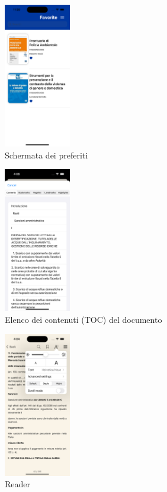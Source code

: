 \begin{multicols}{3}
    \begin{figure}[H]
        \centering
        \includegraphics[width=0.26\textwidth]{img/Simulator Screen Shot - iPhone 14 Pro - 2022-10-05 at 11.20.04.png}
        \caption{Schermata dei preferiti}
        \label{preferiti-ios}
    \end{figure}

    \begin{figure}[H]
        \centering
        \includegraphics[width=0.26\textwidth]{img/toc_ios.png}
        \caption{Elenco dei contenuti (TOC) del documento}
        \label{toc-ios}
    \end{figure}

    \begin{figure}[H]
        \centering
        \includegraphics[width=0.26\textwidth]{img/reader_settings_ios.png}
        \caption{Reader}
        \label{readersettings-ios}
    \end{figure}
    

\end{multicols}
